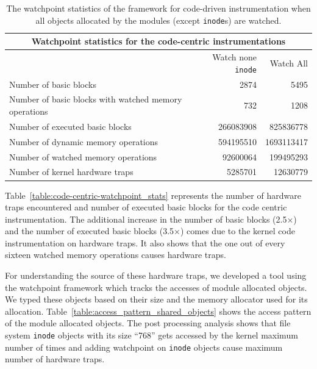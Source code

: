 \begin{table}
\begin{center}
\vspace{1em}
\begin{tabular}{|l|r|r|}
  \hline
  \multicolumn{3}{|c|}{Watchpoint statistics for the code-centric instrumentations}  \\ \hline
  \hline
  & Watch none \texttt{inode} & Watch All \\
  \hline
  Number of basic blocks & 2874 & 5495\\
  \hline
  Number of basic blocks with watched memory operations & 732 & 1208\\
  \hline
  Number of executed basic blocks & 266083908 &  825836778 \\
  \hline
  Number of dynamic memory operations & 594195510 & 1693113417 \\
  \hline
  Number of watched memory operations & 92600064 &199495293 \\
  \hline
  Number of kernel hardware traps & 5285701 & 12630779 \\
  \hline
\end{tabular}
\caption[Watchpoint statistics for code centric instrumentation. The watchpoints are added on all the module allocated objects except file \texttt{inode}s.]{\label{table:code-centric-node-inode-watchpoint_stats} The watchpoint statistics of the framework for code-driven instrumentation when all objects allocated by the modules (except \texttt{inode}s) are watched.}
\end{center}
\end{table}

Table~\ref{table:code-centric-watchpoint_stats} represents the number of hardware traps encountered and number of executed basic blocks for the code centric instrumentation. The additional increase in the number of basic blocks ({\texttildelow}2.5{\footnotesize$\times$}) and the number of executed basic blocks ({\texttildelow}3.5{\footnotesize$\times$}) comes due to the kernel code instrumentation on hardware traps. It also shows that the one out of every sixteen watched memory operations causes hardware traps.

For understanding the source of these hardware traps, we developed a tool using the watchpoint framework which tracks the accesses of module allocated objects. We typed these objects based on their size and the memory allocator used for its allocation. Table~\ref{table:access_pattern_shared_objects} shows the access pattern of the module allocated objects. The post processing analysis shows that file system \texttt{inode} objects with its size ``768'' gets accessed by the kernel maximum number of times and adding watchpoint on \texttt{inode} objects cause maximum number of hardware traps.

